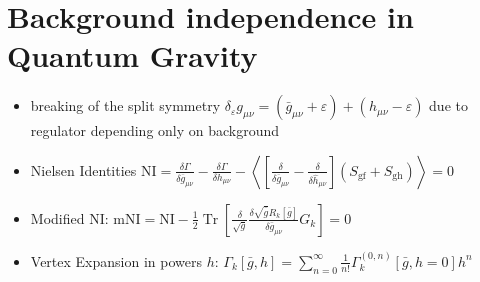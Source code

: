 \chapter{Background independence in Quantum Gravity}\label{chap:BGindependence}
\begin{itemize}
	\item breaking of the split symmetry   $\delta_{\varepsilon}g_{\mu\nu} = \left(\bar{g}_{\mu\nu} + \varepsilon\right) +  \left(h_{\mu\nu} - \varepsilon\right)$ due to regulator depending only on background 
	\item Nielsen Identities $\mathrm{NI}=\frac{\delta \Gamma}{\delta \overline{g}_{\mu \nu}}-\frac{\delta \Gamma}{\delta h_{\mu \nu}}-\left\langle\left[\frac{\delta}{\delta \overline{g}_{\mu \nu}}-\frac{\delta}{\delta \hat{h}_{\mu \nu}}\right]\left(S_{\mathrm{gf}}+S_{\mathrm{gh}}\right)\right\rangle= 0$
	\item Modified NI: $\mathrm{mNI}=\mathrm{NI}-\frac{1}{2} \operatorname{Tr}\left[\frac{\delta}{\sqrt{g}} \frac{\delta \sqrt{\bar{g}} R_{k}[\bar{g}]}{\delta \bar{g}_{\mu \nu}} G_{k}\right]=0$
	\item Vertex Expansion in powers $h$: $\Gamma_{k}[\bar{g}, h]=\sum_{n=0}^{\infty} \frac{1}{n !} \Gamma_{k}^{(0, n)}[\bar{g}, h=0] h^{n}$

	
\end{itemize}
 